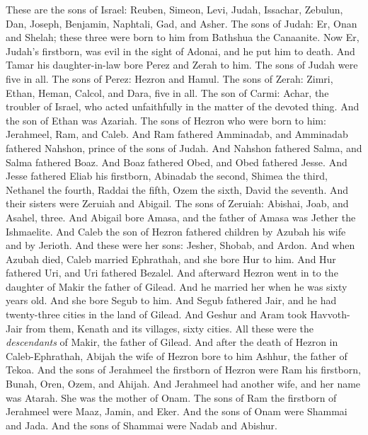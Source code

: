 \begin{biblechapter} %
 These are the sons of Israel: Reuben, Simeon, Levi, Judah, Issachar, Zebulun,
\verse Dan, Joseph, Benjamin, Naphtali, Gad, and Asher.
\verse The sons of Judah: Er, Onan and Shelah; these three were born to him from Bathshua the Canaanite. Now Er, Judah’s firstborn, was evil in the sight of Adonai, and he put him to death.
\verse And Tamar his daughter-in-law bore Perez and Zerah to him. The sons of Judah were five in all.
\verse The sons of Perez: Hezron and Hamul.
\verse The sons of Zerah: Zimri, Ethan, Heman, Calcol, and Dara, five in all.
\verse The son of Carmi: Achar, the troubler of Israel, who acted unfaithfully in the matter of the devoted thing.
\verse And the son of Ethan was Azariah.
\verse The sons of Hezron who were born to him: Jerahmeel, Ram, and Caleb.
\verse And Ram fathered Amminadab, and Amminadab fathered Nahshon, prince of the sons of Judah.
\verse And Nahshon fathered Salma, and Salma fathered Boaz.
\verse And Boaz fathered Obed, and Obed fathered Jesse.
\verse And Jesse fathered Eliab his firstborn, Abinadab the second, Shimea the third,
\verse Nethanel the fourth, Raddai the fifth,
\verse Ozem the sixth, David the seventh.
\verse And their sisters were Zeruiah and Abigail. The sons of Zeruiah: Abishai, Joab, and Asahel, three.
\verse And Abigail bore Amasa, and the father of Amasa was Jether the Ishmaelite.
\verse And Caleb the son of Hezron fathered children by Azubah his wife and by Jerioth. And these were her sons: Jesher, Shobab, and Ardon.
\verse And when Azubah died, Caleb married Ephrathah, and she bore Hur to him.
\verse And Hur fathered Uri, and Uri fathered Bezalel.
\verse And afterward Hezron went in to the daughter of Makir the father of Gilead. And he married her when he was sixty years old. And she bore Segub to him.
\verse And Segub fathered Jair, and he had twenty-three cities in the land of Gilead.
\verse And Geshur and Aram took Havvoth-Jair from them, Kenath and its villages, sixty cities. All these were the \textit{descendants} of Makir, the father of Gilead.
\verse And after the death of Hezron in Caleb-Ephrathah, Abijah the wife of Hezron bore to him Ashhur, the father of Tekoa.
\verse And the sons of Jerahmeel the firstborn of Hezron were Ram his firstborn, Bunah, Oren, Ozem, and Ahijah.
\verse And Jerahmeel had another wife, and her name was Atarah. She was the mother of Onam.
\verse The sons of Ram the firstborn of Jerahmeel were Maaz, Jamin, and Eker.
\verse And the sons of Onam were Shammai and Jada. And the sons of Shammai were Nadab and Abishur.

\end{biblechapter}
